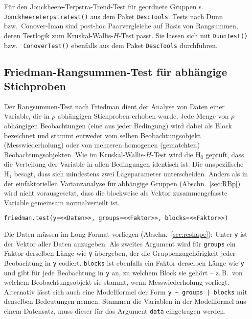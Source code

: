Für den Jonckheere-Terpstra-Trend-Test für geordnete Gruppen s.\  \lstinline!JonckheereTerpstraTest()! aus dem Paket  \lstinline!DescTools!. Tests nach Dunn bzw.\ Conover-Iman sind post-hoc Paarvergleiche auf Basis von Rangsummen, deren Testlogik zum Kruskal-Wallis-$H$-Test passt. Sie lassen sich mit  \lstinline!DunnTest()! bzw.\  \lstinline!ConoverTest()! ebenfalls aus dem Paket  \lstinline!DescTools! durchführen.

\subsection{Friedman-Rangsummen-Test für abhängige Stichproben}
\label{sec:friedman}

Der Rangsummen-Test nach Friedman dient der Analyse von Daten einer Variable, die in $p$ abhängigen Stichproben erhoben wurde. Jede Menge von $p$ abhängigen Beobachtungen (eine aus jeder Bedingung) wird dabei als Block bezeichnet und stammt entweder vom selben Beobachtungsobjekt (Messwiederholung) oder von mehreren homogenen (gematchten) Beobachtungsobjekten. Wie im Kruskal-Wallis-$H$-Test wird die $\text{H}_{0}$ geprüft, dass die Verteilung der Variable in allen Bedingungen identisch ist. Die unspezifische $\text{H}_{1}$ besagt, dass sich mindestens zwei Lageparameter unterscheiden. Anders als in der einfaktoriellen Varianzanalyse für abhängige Gruppen (Abschn.\ \ref{sec:RBp}) wird nicht vorausgesetzt, dass die blockweise als Vektor zusammengefasste Variable gemeinsam normalverteilt ist.
\begin{lstlisting}
friedman.test(y=<<Daten>>, groups=<<Faktor>>, blocks=<<Faktor>>)
\end{lstlisting}

Die Daten müssen im Long-Format vorliegen (Abschn.\ \ref{sec:reshape}): Unter \lstinline!y! ist der Vektor aller Daten anzugeben. Als zweites Argument wird für \lstinline!groups! ein Faktor derselben Länge wie \lstinline!y! übergeben, der die Gruppenzugehörigkeit jeder Beobachtung in \lstinline!y! codiert. \lstinline!blocks! ist ebenfalls ein Faktor derselben Länge wie \lstinline!y! und gibt für jede Beobachtung in \lstinline!y! an, zu welchem Block sie gehört -- z.\,B.\ von welchem Beobachtungsobjekt sie stammt, wenn Messwiederholung vorliegt. Alternativ lässt sich auch eine Modellformel der Form \lstinline!y ~ groups | blocks! mit denselben Bedeutungen nennen. Stammen die Variablen in der Modellformel aus einem Datensatz, muss dieser für das Argument \lstinline!data! eingetragen werden.

